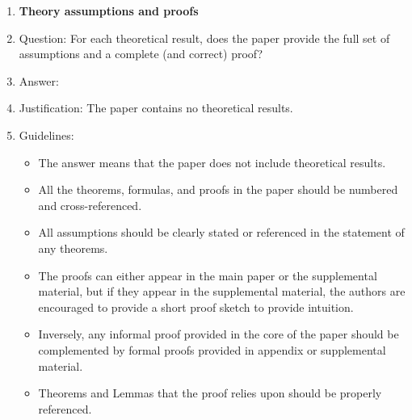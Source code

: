 \documentclass{article}
\begin{document}
\begin{enumerate}
\item {\bf Theory assumptions and proofs}
    \item[] Question: For each theoretical result, does the paper provide the full set of assumptions and a complete (and correct) proof?
    \item[] Answer: \answerNA{}
    \item[] Justification: The paper contains no theoretical results.
    \item[] Guidelines:
    \begin{itemize}
        \item The answer \answerNA{} means that the paper does not include theoretical results. 
        \item All the theorems, formulas, and proofs in the paper should be numbered and cross-referenced.
        \item All assumptions should be clearly stated or referenced in the statement of any theorems.
        \item The proofs can either appear in the main paper or the supplemental material, but if they appear in the supplemental material, the authors are encouraged to provide a short proof sketch to provide intuition. 
        \item Inversely, any informal proof provided in the core of the paper should be complemented by formal proofs provided in appendix or supplemental material.
        \item Theorems and Lemmas that the proof relies upon should be properly referenced. 
    \end{itemize}


\end{enumerate}
\end{document}
